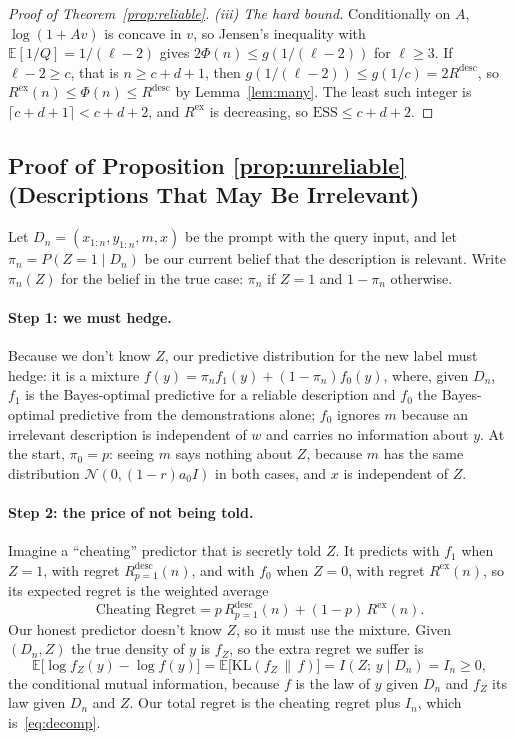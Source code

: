 \documentclass{article}
\newcommand{\ess}{\mathrm{ESS}}
\newcommand{\E}{\mathbb{E}}
\begin{document}
\begin{proof}[Proof of Theorem~\ref{prop:reliable}]
\emph{(iii) The hard bound.} Conditionally on $A$, $\log(1 + Av)$ is concave in $v$, so Jensen's inequality with $\E[1/Q] = 1/(\ell-2)$ gives $2\Phi(n) \le g(1/(\ell-2))$ for $\ell \ge 3$. If $\ell - 2 \ge c$, that is $n \ge c + d + 1$, then $g(1/(\ell-2)) \le g(1/c) = 2R^{\mathrm{desc}}$, so $R^{\mathrm{ex}}(n) \le \Phi(n) \le R^{\mathrm{desc}}$ by Lemma~\ref{lem:many}. The least such integer is $\lceil c + d + 1 \rceil < c + d + 2$, and $R^{\mathrm{ex}}$ is decreasing, so $\ess \le c + d + 2$.
\end{proof}

\subsection{Proof of Proposition \ref{prop:unreliable} (Descriptions That May Be Irrelevant)}\label{app:reliability}
Let $D_n = (x_{1:n}, y_{1:n}, m, x)$ be the prompt with the query input, and let $\pi_n = P(Z = 1 \mid D_n)$ be our current belief that the description is relevant. Write $\pi_n(Z)$ for the belief in the true case: $\pi_n$ if $Z = 1$ and $1 - \pi_n$ otherwise.

\paragraph{Step 1: we must hedge.}
Because we don't know $Z$, our predictive distribution for the new label must hedge: it is a mixture $f(y) = \pi_n f_1(y) + (1 - \pi_n) f_0(y)$, where, given $D_n$, $f_1$ is the Bayes-optimal predictive for a reliable description and $f_0$ the Bayes-optimal predictive from the demonstrations alone; $f_0$ ignores $m$ because an irrelevant description is independent of $w$ and carries no information about $y$. At the start, $\pi_0 = p$: seeing $m$ says nothing about $Z$, because $m$ has the same distribution $\mathcal{N}(0, (1-r) a_0 I)$ in both cases, and $x$ is independent of $Z$.

\paragraph{Step 2: the price of not being told.}
Imagine a ``cheating'' predictor that is secretly told $Z$. It predicts with $f_1$ when $Z=1$, with regret $R^{\mathrm{desc}}_{p=1}(n)$, and with $f_0$ when $Z=0$, with regret $R^{\mathrm{ex}}(n)$, so its expected regret is the weighted average
\[
\text{Cheating Regret} = p\, R^{\mathrm{desc}}_{p=1}(n) + (1-p)\, R^{\mathrm{ex}}(n).
\]
Our honest predictor doesn't know $Z$, so it must use the mixture. Given $(D_n, Z)$ the true density of $y$ is $f_Z$, so the extra regret we suffer is
\[
\E\big[\log f_Z(y) - \log f(y)\big] = \E\big[\mathrm{KL}(f_Z \,\|\, f)\big] = I(Z;\, y \mid D_n) = I_n \ge 0,
\]
the conditional mutual information, because $f$ is the law of $y$ given $D_n$ and $f_Z$ its law given $D_n$ and $Z$. Our total regret is the cheating regret plus $I_n$, which is~\eqref{eq:decomp}.
\end{document}

